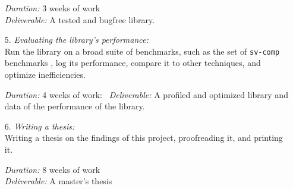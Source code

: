 \begin{itemize}
			  \textsl{Duration:} 3 weeks of work \\
			  \textsl{Deliverable:} A tested and bugfree \qvasr library.

	\item[5.] \textsl{Evaluating the library's performance:} \\
               Run the library on a broad suite of benchmarks, such as the set of \texttt{sv-comp} benchmarks \cite{svcomp}, log its performance, compare it to other techniques, and optimize inefficiencies.

			  \textsl{Duration:} 4 weeks of work: \
			  \textsl{Deliverable:} A profiled and optimized library and data of the performance of the \qvasr library.

	\item[6.] \textsl{Writing a thesis:} \\
              Writing a thesis on the findings of this project, proofreading it, and printing it.

			  \textsl{Duration:} 8 weeks of work \\
			  \textsl{Deliverable:}	A master's thesis
\end{itemize}
